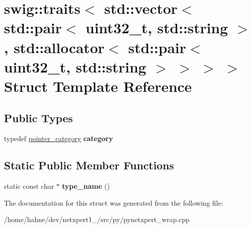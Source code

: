 \hypertarget{structswig_1_1traits_3_01std_1_1vector_3_01std_1_1pair_3_01uint32__t_00_01std_1_1string_01_4_00_72c25cfc4d85f63c79b61fe621f15476}{}\section{swig\+:\+:traits$<$ std\+:\+:vector$<$ std\+:\+:pair$<$ uint32\+\_\+t, std\+:\+:string $>$, std\+:\+:allocator$<$ std\+:\+:pair$<$ uint32\+\_\+t, std\+:\+:string $>$ $>$ $>$ $>$ Struct Template Reference}
\label{structswig_1_1traits_3_01std_1_1vector_3_01std_1_1pair_3_01uint32__t_00_01std_1_1string_01_4_00_72c25cfc4d85f63c79b61fe621f15476}
\subsection*{Public Types}
\begin{DoxyCompactItemize}
\item 
typedef \hyperlink{structswig_1_1pointer__category}{pointer\+\_\+category} {\bfseries category}\hypertarget{structswig_1_1traits_3_01std_1_1vector_3_01std_1_1pair_3_01uint32__t_00_01std_1_1string_01_4_00_72c25cfc4d85f63c79b61fe621f15476_ad1452475f4ed95e9a498e53ac2332c13}{}\label{structswig_1_1traits_3_01std_1_1vector_3_01std_1_1pair_3_01uint32__t_00_01std_1_1string_01_4_00_72c25cfc4d85f63c79b61fe621f15476_ad1452475f4ed95e9a498e53ac2332c13}

\end{DoxyCompactItemize}
\subsection*{Static Public Member Functions}
\begin{DoxyCompactItemize}
\item 
static const char $\ast$ {\bfseries type\+\_\+name} ()\hypertarget{structswig_1_1traits_3_01std_1_1vector_3_01std_1_1pair_3_01uint32__t_00_01std_1_1string_01_4_00_72c25cfc4d85f63c79b61fe621f15476_a30e10766d8ea68fdb8bdd217dc605de3}{}\label{structswig_1_1traits_3_01std_1_1vector_3_01std_1_1pair_3_01uint32__t_00_01std_1_1string_01_4_00_72c25cfc4d85f63c79b61fe621f15476_a30e10766d8ea68fdb8bdd217dc605de3}

\end{DoxyCompactItemize}


The documentation for this struct was generated from the following file\+:\begin{DoxyCompactItemize}
\item 
/home/hahne/dev/netxpert1\+\_/src/py/pynetxpert\+\_\+wrap.\+cpp\end{DoxyCompactItemize}
